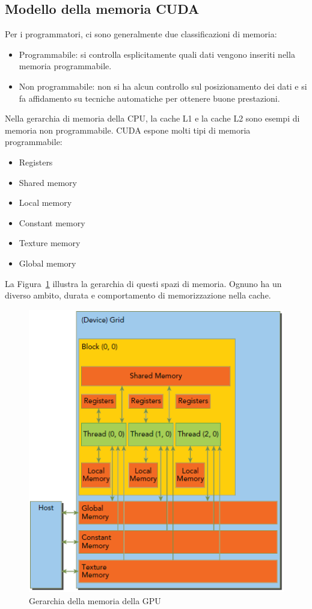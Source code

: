 \subsection{Modello della memoria CUDA}
\label{sec:CUDA Memory Model}
Per i programmatori, ci sono generalmente due classificazioni di memoria:
\begin{itemize}
	\item Programmabile: si controlla esplicitamente quali dati vengono inseriti nella memoria programmabile.
	\item Non programmabile: non si ha alcun controllo sul posizionamento dei dati e si fa affidamento su tecniche automatiche per ottenere buone prestazioni.
\end{itemize}
Nella gerarchia di memoria della CPU, la cache L1 e la cache L2 sono esempi di memoria non programmabile. CUDA espone molti tipi di memoria programmabile:
\begin{itemize}
	\item Registers
	\item Shared memory
	\item Local memory
	\item Constant memory
	\item Texture memory
	\item Global memory
\end{itemize}
La Figura~\ref{fig:GPU_Memory_Hierarchy} illustra la gerarchia di questi spazi di memoria. Ognuno ha un diverso ambito, durata e comportamento di memorizzazione nella cache.
\begin{figure}[h!]
	\centering
	\includegraphics[width=.7\textwidth]{Immagini/CUDA/GPU_Memory_Hierarchy}
	\caption{Gerarchia della memoria della GPU \cite{Cheng:ProfessionalCudaProgramming}}
	\label{fig:GPU_Memory_Hierarchy}
\end{figure}
